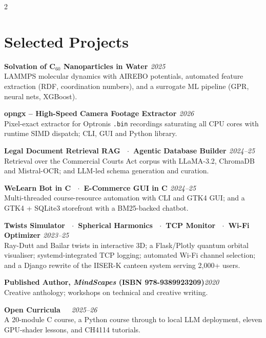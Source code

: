 \documentclass[a4paper,10.5pt]{extarticle}
\newcommand{\entry}[3]{%
  {\normalsize\textbf{#1}}\hfill{\small\itshape\textcolor{mutedtext}{#2}}\\[0.04em]
  {\small #3}\par\vspace{3pt}%
}
\begin{document}
\begin{paracol}{2}
\section{Selected Projects}

\entry{Solvation of C$_{60}$ Nanoparticles in Water \href{https://github.com/Shuvam-Banerji-Seal/Solvent-Structure-around-NanoParticles}{\faGithub}}{2025}{%
LAMMPS molecular dynamics with AIREBO potentials, automated feature extraction (RDF, coordination numbers), and a surrogate ML pipeline (GPR, neural nets, XGBoost).}

\entry{opngx -- High-Speed Camera Footage Extractor \href{https://github.com/Shuvam-Banerji-Seal/opngx}{\faGithub}}{2026}{%
Pixel-exact extractor for Optronis \texttt{.bin} recordings saturating all CPU cores with runtime SIMD dispatch; CLI, GUI and Python library.}

\entry{Legal Document Retrieval RAG \href{https://github.com/Shuvam-Banerji-Seal/CCA-2015-LLM}{\faGithub}~$\cdot$~Agentic Database Builder \href{https://github.com/Shuvam-Banerji-Seal/Agentic_Database_Builder}{\faGithub}}{2024--25}{%
Retrieval over the Commercial Courts Act corpus with LLaMA-3.2, ChromaDB and Mistral-OCR; and LLM-led schema generation and curation.}

\entry{WeLearn Bot in C \href{https://github.com/Shuvam-Banerji-Seal/welearnbot_in_C}{\faGithub}~$\cdot$~E-Commerce GUI in C \href{https://github.com/Shuvam-Banerji-Seal/CS3101-E-Commerce-App-in-C.git}{\faGithub}}{2024--25}{%
Multi-threaded course-resource automation with CLI and GTK4 GUI; and a GTK4 + SQLite3 storefront with a BM25-backed chatbot.}

\entry{Twists Simulator \href{https://github.com/Shuvam-Banerji-Seal/Ray-Dutt-and-Bailar-Twists-Simulator}{\faGithub}~$\cdot$~Spherical Harmonics \href{https://github.com/Shuvam-Banerji-Seal/simple-spherical-harmonics-visualizer}{\faGithub}~$\cdot$~TCP Monitor \href{https://github.com/Shuvam-Banerji-Seal/TCP-Count-Monitor-for-Arch-Linux}{\faGithub}~$\cdot$~Wi-Fi Optimizer \href{https://github.com/Shuvam-Banerji-Seal/Wi-Fi-channel-optimizer}{\faGithub}}{2023--25}{%
Ray-Dutt and Bailar twists in interactive 3D; a Flask/Plotly quantum orbital visualiser; systemd-integrated TCP logging; automated Wi-Fi channel selection; and a Django rewrite of the IISER-K canteen system serving 2,000+ users.}

\entry{Published Author, \textit{MindScapes} (ISBN 978-9389923209)}{2020}{%
Creative anthology; workshops on technical and creative writing.}

\entry{Open Curricula \href{https://github.com/Shuvam-Banerji-Seal/C-Programming-for-Beginners}{\faGithub}~\href{https://github.com/Shuvam-Banerji-Seal/Python-Course-for-Beginners}{\faGithub}~\href{https://github.com/Shuvam-Banerji-Seal/shaders-for-beginners}{\faGithub}}{2025--26}{%
A 20-module C course, a Python course through to local LLM deployment, eleven GPU-shader lessons, and CH4114 tutorials.}

\end{paracol}
\end{document}
